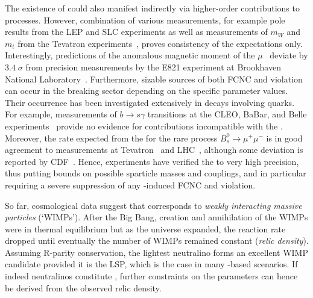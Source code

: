 The existence of \susy could also manifest indirectly via higher-order contributions to \sm processes.
However, combination of various measurements, for example \Z pole results from the LEP and SLC experiments as well as measurements of $m_{W}$ and $m_{t}$ from the Tevatron experiments~\cite{LEPEWKWG:2010vi}, proves consistency of the \sm expectations only.
Interestingly, \sm predictions of the anomalous magnetic moment of the $\mu$~\cite{Hagiwara:2006jt} deviate by $3.4\;\sigma$ from precision measurements by the E821 experiment at Brookhaven National Laboratory~\cite{Bennett:2006fi}.
Furthermore, sizable sources of both FCNC and \cp violation can occur in the \susy breaking sector depending on the specific parameter values.
Their occurrence has been investigated extensively in decays involving \qb quarks.
For example, measurements of \mbox{$b\rightarrow s\gamma$} transitions at the CLEO, BaBar, and Belle experiments~\cite{Chen:2001fja,Aubert:2006gg,Limosani:2009qg} provide no evidence for contributions incompatible with the \sm.
Moreover, the rate expected from the \sm for the rare process \mbox{$B^{0}_{s}\rightarrow\mu^{+}\mu^{-}$} is in good agreement to measurements at Tevatron~\cite{Abazov:2010fs} and LHC~\cite{CMS-PAS-BPH-11-019}, although some deviation is reported by CDF~\cite{Aaltonen:2011fi}.
Hence, experiments have verified the \sm to very high precision, thus putting bounds on possible sparticle masses and couplings, and in particular requiring a severe suppression of any \susy-induced FCNC and \cp violation.

So far, cosmological data suggest that \dm corresponds to \emph{weakly interacting massive particles} (`WIMPs').
After the Big Bang, creation and annihilation of the WIMPs were in thermal equilibrium but as the universe expanded, the reaction rate dropped until eventually the number of WIMPs remained constant (\emph{relic density}).
Assuming R-parity conservation, the lightest neutralino forms an excellent WIMP candidate provided it is the LSP, which is the case in many \mssm-based scenarios.
If indeed neutralinos constitute \dm, further constraints on the \mssm parameters can hence be derived from the observed relic density.\addref








\cleardoublepage
